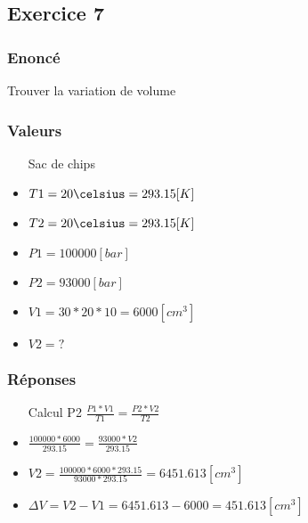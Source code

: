 
\subsection{Exercice 7}
\subsubsection{Enoncé}
Trouver la variation de volume
\subsubsection{Valeurs}
\begin{itemize}
    \item[Sac de chips]
    \item $T1 = 20\celsius = 293.15 [K]$
    \item $T2 = 20\celsius = 293.15 [K]$  
    \item $P1 = 100000[bar]$
    \item $P2 = 93000[bar]$
    \item $V1 = 30*20*10 = 6000[cm^3]$
    \item $V2 = ?$
\end{itemize}

\subsubsection{Réponses}
\begin{itemize} 
    \item[Calcul P2 ] $\frac{P1*V1}{T1} = \frac{P2*V2}{T2}$
    \item $\frac{100000*6000}{293.15} = \frac{93000 * V2}{293.15}$
    \item $V2 = \frac{100000*6000*293.15}{93000 * 293.15} = 6451.613[cm^3]$
    \item $\Delta{V} = V2 - V1 = 6451.613 - 6000 = 451.613[cm^3]$
\end{itemize}